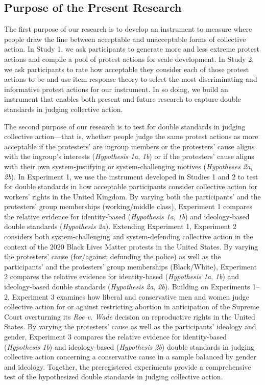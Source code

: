 \documentclass[12pt, letterpaper]{article}
\begin{document}
\hypertarget{purpose-of-the-present-research}{%
\subsection{Purpose of the Present
Research}\label{purpose-of-the-present-research}}

The first purpose of our research is to develop an instrument to measure
where people draw the line between acceptable and unacceptable forms of
collective action. In Study 1, we ask participants to generate more and
less extreme protest actions and compile a pool of protest actions for
scale development. In Study 2, we ask participants to rate how
acceptable they consider each of those protest actions to be and use
item response theory to select the most discriminating and informative
protest actions for our instrument. In so doing, we build an instrument
that enables both present and future research to capture double
standards in judging collective action.

The second purpose of our research is to test for double standards in
judging collective action---that is, whether people judge the same
protest actions as more acceptable if the protesters' are ingroup
members or the protesters' cause aligns with the ingroup's interests
(\emph{Hypothesis 1a}, \emph{1b}) or if the protesters' cause aligns
with their own system-justifying or system-challenging motives
(\emph{Hypotheses 2a}, \emph{2b}). In Experiment 1, we use the
instrument developed in Studies 1 and 2 to test for double standards in
how acceptable participants consider collective action for workers'
rights in the United Kingdom. By varying both the participants' and the
protesters' group memberships (working/middle class), Experiment 1
compares the relative evidence for identity-based (\emph{Hypothesis 1a},
\emph{1b}) and ideology-based double standards (\emph{Hypothesis 2a}).
Extending Experiment 1, Experiment 2 considers both system-challenging
and system-defending collective action in the context of the 2020 Black
Lives Matter protests in the United States. By varying the protesters'
cause (for/against defunding the police) as well as the participants'
and the protesters' group memberships (Black/White), Experiment 2
compares the relative evidence for identity-based (\emph{Hypothesis 1a},
\emph{1b}) and ideology-based double standards (\emph{Hypothesis 2a},
\emph{2b}). Building on Experiments 1--2, Experiment 3 examines how
liberal and conservative men and women judge collective action for or
against restricting abortion in anticipation of the Supreme Court
overturning its \emph{Roe v. Wade} decision on reproductive rights in
the United States. By varying the protesters' cause as well as the
participants' ideology and gender, Experiment 3 compares the relative
evidence for identity-based (\emph{Hypothesis 1b}) and ideology-based
(\emph{Hypothesis 2b}) double standards in judging collective action
concerning a conservative cause in a sample balanced by gender and
ideology. Together, the preregistered experiments provide a
comprehensive test of the hypothesized double standards in judging
collective action.
\end{document}
